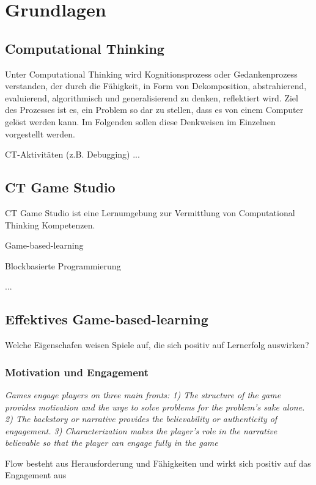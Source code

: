 \chapter{Grundlagen}

\section{Computational Thinking}

Unter Computational Thinking wird Kognitionsprozess oder Gedankenprozess verstanden, der durch die
Fähigkeit, in Form von Dekomposition, abstrahierend, evaluierend, algorithmisch und generalisierend
zu denken, reflektiert wird. Ziel des Prozesses ist es, ein Problem so dar zu stellen, dass es von
einem Computer gelöst werden kann. Im Folgenden sollen diese Denkweisen im Einzelnen vorgestellt
werden.

CT-Aktivitäten (z.B. Debugging)
...



\section{CT Game Studio}

CT Game Studio ist eine Lernumgebung zur Vermittlung von Computational Thinking Kompetenzen.

Game-based-learning

Blockbasierte Programmierung

...

\section{Effektives Game-based-learning}

Welche Eigenschafen weisen Spiele auf, die sich positiv auf Lernerfolg auswirken?

\subsection{Motivation und Engagement}

\textit{Games engage players on three main fronts: 1) The structure of the game provides motivation and the
urge to solve problems for the problem's sake alone. 2) The backstory or narrative provides the
believability or authenticity of engagement. 3) Characterization makes the player's role in the
narrative believable so that the player can engage fully in the game}

Flow besteht aus Herausforderung und Fähigkeiten und wirkt sich positiv auf das Engagement aus

